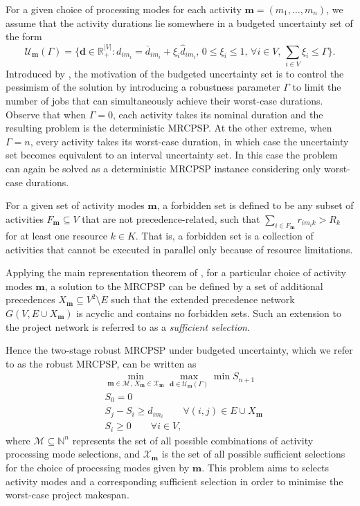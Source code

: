 \documentclass[a4paper,abstracton]{scrartcl}
\newcommand{\M}{{\mathcal{M}}}
\newcommand{\U}{{\mathcal{U}}}
\newcommand{\X}{{\mathcal{X}}}
\begin{document}
For a given choice of processing modes for each activity $\bm{m}=(m_1,\dots,m_n)$, we assume that the activity durations lie somewhere in a budgeted uncertainty set of the form
$$\U_{\bm{m}}(\Gamma)=\Bigg\{\bm{d}\in\mathbb{R}_+^{|V|}:d_{im_i}=\bar{d}_{im_i}+\xi_i\hat{d}_{im_i},\,0\leq \xi_i \leq 1,\,\forall i\in V,\,\sum_{i\in V}\xi_i \leq \Gamma\Bigg\}.$$
Introduced by \cite{bertsimas2004price}, the motivation of the budgeted uncertainty set is to control the pessimism of the solution by introducing a robustness parameter $\Gamma$ to limit the number of jobs that can simultaneously achieve their worst-case durations. Observe that when $\Gamma=0$, each activity takes its nominal duration and the resulting problem is the deterministic MRCPSP. At the other extreme, when $\Gamma=n$, every activity takes its worst-case duration, in which case the uncertainty set becomes equivalent to an interval uncertainty set. In this case the problem can again be solved as a deterministic MRCPSP instance considering only worst-case durations.

For a given set of activity modes $\bm{m}$, a forbidden set is defined to be any subset of activities $F_{\bm{m}}\subseteq V$ that are not precedence-related, such that $\sum_{i\in F_{\bm{m}}}r_{im_ik}>R_k$ for at least one resource $k\in K$. That is, a forbidden set is a collection of activities that cannot be executed in parallel only because of resource limitations.

Applying the main representation theorem of \cite{bartusch1988scheduling}, for a particular choice of activity modes $\bm{m}$, a solution to the MRCPSP can be defined by a set of additional precedences $X_{\bm{m}}\subseteq V^2\setminus E$ such that the extended precedence network $G(V,E\cup X_{\bm{m}})$ is acyclic and contains no forbidden sets. Such an extension to the project network is referred to as a \textit{sufficient selection}.

Hence the two-stage robust MRCPSP under budgeted uncertainty, which we refer to as the robust MRCPSP, can be written as
\begin{align}
	& \min_{\bm{m}\in \M,\,X_{\bm{m}}\in \X_{\bm{m}}} \max_{\bm{d}\in\U_{\bm{m}}(\Gamma)} \min S_{n+1}\label{eqn:robust_mrcpsp_1}\\
	& S_0 = 0\\
	& S_j - S_i \geq d_{im_i} \qquad \forall (i,j)\in E\cup X_{\bm{m}}\\
	& S_i \geq 0 \qquad \forall i\in V,\label{eqn:robust_mrcpsp_4}
\end{align}
where $\M\subseteq \mathbb{N}^n$ represents the set of all possible combinations of activity processing mode selections, and $\X_{\bm{m}}$ is the set of all possible sufficient selections for the choice of processing modes given by $\bm{m}$. This problem aims to selects activity modes and a corresponding sufficient selection in order to minimise the worst-case project makespan. 
\end{document}
